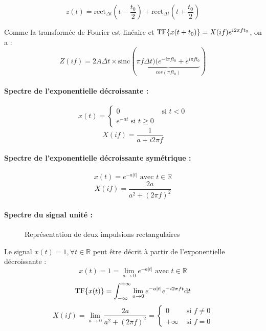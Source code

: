 \documentclass[a4paper,12pt]{article}
\begin{document}
\[ z(t) = \mathrm{rect}_{\Delta t}(t - \dfrac{t_0}{2}) + \mathrm{rect}_{\Delta t}(t + \dfrac{t_0}{2}) \]

Comme la transformée de Fourier est linéaire et $\mathrm{TF} \{  x(t + t_0) \} = X(if)e^{i2\pi ft_0}$, on a :
\[ Z(if) = 2A\Delta t \times \mathrm{sinc}(\underbrace{\pi f\Delta t)(e^{-i\pi ft_0} + e^{i\pi ft_0}}_{cos(\pi ft_0)}) \]

\paragraph{Spectre de l'exponentielle décroissante :}
\[ x(t) = \begin{cases}
    0 & \text{ si } t < 0 \\
    e^{-at} \text{ si } t \geq 0
\end{cases} \]
\[ X(if) = \dfrac{1}{a+i2\pi f} \]

\paragraph{Spectre de l'exponentielle décroissante symétrique :}
\[ x(t) = e^{-a|t|} \text{ avec } t \in \mathbb{R} \]
\[ X(if) = \dfrac{2a}{a^2+(2\pi f)^2} \]

\paragraph{Spectre du signal unité :}

\begin{figure}[!htbp]
	\centering
	\caption{Représentation de deux impulsions rectangulaires}
\end{figure}

Le signal $x(t) = 1, \forall t \in \mathbb{R}$ peut être décrit à partir de l'exponentielle décroissante :
\[ x(t) = 1 = \lim_{a \to 0} e^{-a|t|} \text{ avec } t \in \mathbb{R} \]
\[ \mathrm{TF} \{  x(t) \} = \int_{-\infty}^{+\infty} \lim_{a \to 0} e^{-a|t|} e^{-i2\pi ft} \mathrm{d}t \]
\[ X(if) = \lim_{a \to 0} \dfrac{2a}{a^2 + (2\pi f)^2} = \begin{cases}
    0 & \text{ si } f \neq 0 \\
    +\infty & \text{ si } f = 0
\end{cases} \]
\end{document}
